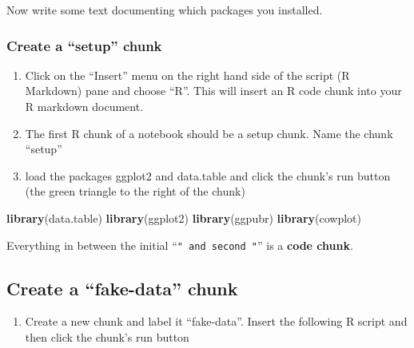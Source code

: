\documentclass[]{book}
\newenvironment{Shaded}{\begin{snugshade}}{\end{snugshade}}
\newcommand{\KeywordTok}[1]{\textcolor[rgb]{0.13,0.29,0.53}{\textbf{#1}}}
\newcommand{\NormalTok}[1]{#1}
\providecommand{\tightlist}{%
  \setlength{\itemsep}{0pt}\setlength{\parskip}{0pt}}
\begin{document}
Now write some text documenting which packages you installed.

\hypertarget{create-a-setup-chunk}{%
\subsubsection{Create a ``setup'' chunk}\label{create-a-setup-chunk}}

\begin{enumerate}
\def\labelenumi{\arabic{enumi}.}
\tightlist
\item
  Click on the ``Insert'' menu on the right hand side of the script (R Markdown) pane and choose ``R''. This will insert an R code chunk into your R markdown document.
\item
  The first R chunk of a notebook should be a setup chunk. Name the chunk ``setup''
\item
  load the packages ggplot2 and data.table and click the chunk's run button (the green triangle to the right of the chunk)
\end{enumerate}

\begin{Shaded}
\begin{Highlighting}[]
\KeywordTok{library}\NormalTok{(data.table)}
\KeywordTok{library}\NormalTok{(ggplot2)}
\KeywordTok{library}\NormalTok{(ggpubr)}
\KeywordTok{library}\NormalTok{(cowplot)}
\end{Highlighting}
\end{Shaded}

Everything in between the initial ``\texttt{"\ and\ second\ "}'' is a \textbf{code chunk}.

\hypertarget{create-a-fake-data-chunk}{%
\subsection{Create a ``fake-data'' chunk}\label{create-a-fake-data-chunk}}

\begin{enumerate}
\def\labelenumi{\arabic{enumi}.}
\setcounter{enumi}{3}
\tightlist
\item
  Create a new chunk and label it ``fake-data''. Insert the following R script and then click the chunk's run button
\end{enumerate}
\end{document}
